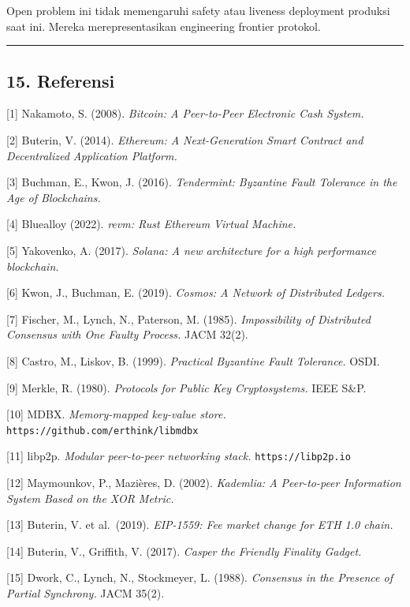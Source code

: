 \documentclass[11pt,a4paper]{article}
\begin{document}
Open problem ini tidak memengaruhi safety atau liveness deployment produksi saat ini. Mereka merepresentasikan engineering frontier protokol.

\begin{center}\rule{0.5\linewidth}{0.5pt}\end{center}

\hypertarget{referensi}{%
\subsection{15. Referensi}\label{referensi}}

{[}1{]} Nakamoto, S. (2008). \emph{Bitcoin: A Peer-to-Peer Electronic Cash System.}

{[}2{]} Buterin, V. (2014). \emph{Ethereum: A Next-Generation Smart Contract and Decentralized Application Platform.}

{[}3{]} Buchman, E., Kwon, J. (2016). \emph{Tendermint: Byzantine Fault Tolerance in the Age of Blockchains.}

{[}4{]} Bluealloy (2022). \emph{revm: Rust Ethereum Virtual Machine.}

{[}5{]} Yakovenko, A. (2017). \emph{Solana: A new architecture for a high performance blockchain.}

{[}6{]} Kwon, J., Buchman, E. (2019). \emph{Cosmos: A Network of Distributed Ledgers.}

{[}7{]} Fischer, M., Lynch, N., Paterson, M. (1985). \emph{Impossibility of Distributed Consensus with One Faulty Process.} JACM 32(2).

{[}8{]} Castro, M., Liskov, B. (1999). \emph{Practical Byzantine Fault Tolerance.} OSDI.

{[}9{]} Merkle, R. (1980). \emph{Protocols for Public Key Cryptosystems.} IEEE S\&P.

{[}10{]} MDBX. \emph{Memory-mapped key-value store.} \texttt{https://github.com/erthink/libmdbx}

{[}11{]} libp2p. \emph{Modular peer-to-peer networking stack.} \texttt{https://libp2p.io}

{[}12{]} Maymounkov, P., Mazières, D. (2002). \emph{Kademlia: A Peer-to-peer Information System Based on the XOR Metric.}

{[}13{]} Buterin, V. et al.~(2019). \emph{EIP-1559: Fee market change for ETH 1.0 chain.}

{[}14{]} Buterin, V., Griffith, V. (2017). \emph{Casper the Friendly Finality Gadget.}

{[}15{]} Dwork, C., Lynch, N., Stockmeyer, L. (1988). \emph{Consensus in the Presence of Partial Synchrony.} JACM 35(2).
\end{document}
